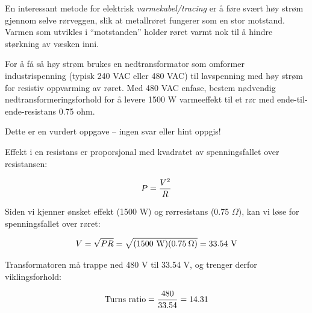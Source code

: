 

En interessant metode for elektrisk {\it varmekabel/tracing} er å føre svært høy strøm gjennom selve rørveggen, slik at metallrøret fungerer som en stor motstand. Varmen som utvikles i ``motstanden'' holder røret varmt nok til å hindre størkning av væsken inni.

\vskip 10pt

For å få så høy strøm brukes en nedtransformator som omformer industrispenning (typisk 240 VAC eller 480 VAC) til lavspenning med høy strøm for resistiv oppvarming av røret. Med 480 VAC enfase, bestem nødvendig nedtransformeringsforhold for å levere 1500 W varmeeffekt til et rør med ende-til-ende-resistans 0.75 ohm.

\vfil 

\eject






Dette er en vurdert oppgave -- ingen svar eller hint oppgis!







Effekt i en resistans er proporsjonal med kvadratet av spenningsfallet over resistansen:

$$P = {V^2 \over R}$$

Siden vi kjenner ønsket effekt (1500 W) og rørresistans (0.75 $\Omega$), kan vi løse for spenningsfallet over røret:

$$V = \sqrt{P R} = \sqrt{(1500 \hbox { W})(0.75 \> \Omega)} = 33.54 \hbox{ V}$$
 
Transformatoren må trappe ned 480 V til 33.54 V, og trenger derfor viklingsforhold:

$$\hbox{Turns ratio} = {480 \over 33.54} = 14.31$$


